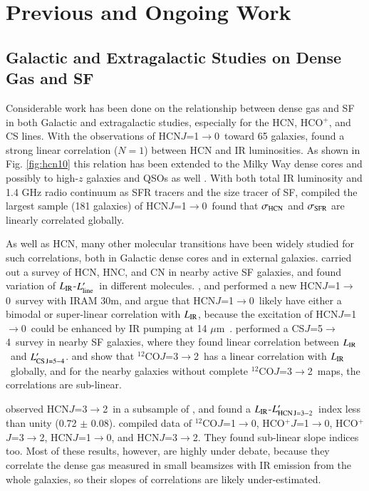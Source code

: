 \documentclass[legal,11pt]{article}
\def\,{\thinspace}
\def\mum{$\mu$m}
\def\Lcsff  {$L'_{\rm CS\, J=5-4}$}
\def\Lline  {$L'_{\rm line}$}
\def\LIR     {$L_{\rm IR}$}
\def\LHCNtt  {$L'_{\rm HCN\, J=3-2}$}
\def\COtt    {CO$J=3-2$}
\def\HCOP       {HCO$^{+}$}
\def\HCNoz      {HCN\,$J$=1$\rightarrow$0}
\def\HCOPoz      {HCO$^+$\,$J$=1$\rightarrow$0}
\def\HCOPtt      {HCO$^+$\,$J$=3$\rightarrow$2}
\def\HCNtt        {HCN\,$J$=3$\rightarrow$2}
\def\CSff          {CS\,$J$=5$\rightarrow$4}
\def\COoz      {$^{12}$CO$J$=1$\rightarrow$0}
\def\COtt      {$^{12}$CO$J$=3$\rightarrow$2}
\begin{document}
\section{Previous and Ongoing Work}

\subsection{Galactic and Extragalactic Studies on Dense Gas and SF}

Considerable work has been done on the relationship between dense gas and SF in
both Galactic and extragalactic studies, especially for the HCN, \HCOP, and CS
lines. With the observations of \HCNoz\ toward 65 galaxies, \citet{gs04a,gs04b}
found a strong linear correlation ($N=1$) between HCN and IR luminosities. As
shown in Fig. \ref{fig:hcn10} this relation has been extended to the Milky Way
dense cores  \citep{weg05} and possibly to high-$z$ galaxies and QSOs as well
\citep{Gao2007}. With both total IR luminosity and 1.4 GHz radio continuum as
SFR tracers and the size tracer of SF, \cite{lgg2015} compiled the largest
sample (181 galaxies) of \HCNoz\ found that $\sigma_{\rm HCN}$ and $\sigma_{\rm
SFR}$ are linearly correlated globally.   

As well as HCN, many other molecular transitions have been widely studied for
such correlations, both in Galactic dense cores and in external galaxies.
\cite{Baan08} carried out a survey of HCN, HNC, and CN in nearby active SF
galaxies, and found variation of \LIR-\Lline\ in different molecules.
\citet{gc08}, and \citet{gb12} performed a new \HCNoz\ survey with IRAM 30m,
and argue that \HCNoz\ likely have either a bimodal or super-linear correlation
with \LIR, because the excitation of \HCNoz\ could be enhanced by IR pumping at
14 \mum\ \citep{Weiss2007,sae10}.  \cite{Wang2011} performed a \CSff\ survey in
nearby SF galaxies, where they found linear correlation between \LIR\ and
\Lcsff. \citet{msh10} and \citet{Wilson2012} show that \COtt\ has a linear
correlation with \LIR\ globally, and for the nearby galaxies without complete
\COtt\ maps, the correlations are sub-linear. 

\cite{bns08} observed \HCNtt\ in a subsample of \citet{gs04a}, and found a
\LIR-\LHCNtt\ index less than unity (0.72 $\pm$ 0.08). \cite{jnm09} compiled
data of \COoz, \HCOPoz, \HCOPtt, \HCNoz, and \HCNtt. They found sub-linear
slope indices too. Most of these results, however, are highly under debate,
because they correlate the dense gas measured in small beamsizes with IR
emission from the whole galaxies, so their slopes of correlations are likely
under-estimated.
\end{document}
